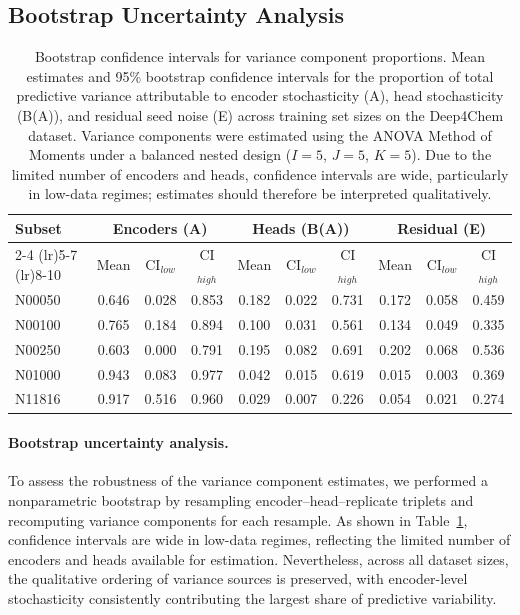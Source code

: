 \subsection{Bootstrap Uncertainty Analysis}
\begin{table}[ht]
\centering
\caption{Bootstrap confidence intervals for variance component proportions. Mean estimates and 95\% bootstrap confidence intervals for the proportion of total predictive variance attributable to encoder stochasticity (A), head stochasticity (B(A)), and residual seed noise (E) across training set sizes on the Deep4Chem dataset. Variance components were estimated using the ANOVA Method of Moments under a balanced nested design ($I=5$, $J=5$, $K=5$). Due to the limited number of encoders and heads, confidence intervals are wide, particularly in low-data regimes; estimates should therefore be interpreted qualitatively.}
\label{tab:si_varcomp_bootstrap}
\begin{tabular}{lccccccccc}
\toprule
\textbf{Subset} &
\multicolumn{3}{c}{\textbf{Encoders (A)}} &
\multicolumn{3}{c}{\textbf{Heads (B(A))}} &
\multicolumn{3}{c}{\textbf{Residual (E)}} \\
\cmidrule(lr){2-4} \cmidrule(lr){5-7} \cmidrule(lr){8-10}
 & Mean & CI$_{low}$ & CI$_{high}$
 & Mean & CI$_{low}$ & CI$_{high}$
 & Mean & CI$_{low}$ & CI$_{high}$ \\
\midrule
N00050  & 0.646 & 0.028 & 0.853 & 0.182 & 0.022 & 0.731 & 0.172 & 0.058 & 0.459 \\
N00100  & 0.765 & 0.184 & 0.894 & 0.100 & 0.031 & 0.561 & 0.134 & 0.049 & 0.335 \\
N00250  & 0.603 & 0.000 & 0.791 & 0.195 & 0.082 & 0.691 & 0.202 & 0.068 & 0.536 \\
N01000  & 0.943 & 0.083 & 0.977 & 0.042 & 0.015 & 0.619 & 0.015 & 0.003 & 0.369 \\
N11816  & 0.917 & 0.516 & 0.960 & 0.029 & 0.007 & 0.226 & 0.054 & 0.021 & 0.274 \\
\bottomrule
\end{tabular}
\end{table}

\paragraph{Bootstrap uncertainty analysis.}
To assess the robustness of the variance component estimates, we performed a nonparametric bootstrap by resampling encoder--head--replicate triplets and recomputing variance components for each resample. As shown in Table~\ref{tab:si_varcomp_bootstrap}, confidence intervals are wide in low-data regimes, reflecting the limited number of encoders and heads available for estimation. Nevertheless, across all dataset sizes, the qualitative ordering of variance sources is preserved, with encoder-level stochasticity consistently contributing the largest share of predictive variability.

